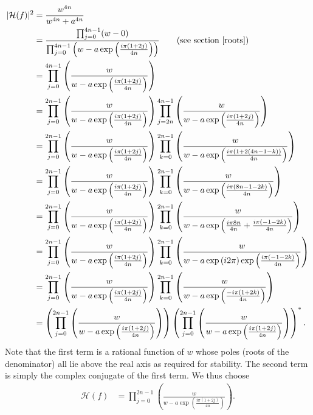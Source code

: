 \documentclass[a4paper]{article}
\begin{document}
\begin{align}
    |\mathcal{H}(f)|^2 &= \frac{w^{4n}}{w^{4n} + a^{4n}} \label{eq:high_pass_factor1}\\
                       &=  \frac{\prod_{j=0}^{4 n - 1}(w - 0)}{\prod_{j=0}^{4 n - 1}\left(w - a\exp\left(\frac{i \pi (1 + 2 j)}{4 n}\right)\right)} \qquad\textrm{(see section \ref{roots})} \label{eq:high_pass_factor2}\\
                       &= \prod_{j=0}^{4 n - 1} \left(\frac{w}{w - a\exp\left(\frac{i \pi (1 + 2 j)}{4 n}\right)}\right) \\
                       &= \prod_{j=0}^{2 n - 1} \left(\frac{w}{w - a\exp\left(\frac{i \pi (1 + 2 j)}{4 n}\right)}\right)
                          \prod_{j=2n}^{4 n - 1} \left(\frac{w}{w - a\exp\left(\frac{i \pi (1 + 2 j)}{4 n}\right)}\right) \\
                       &= \prod_{j=0}^{2 n - 1} \left(\frac{w}{w - a\exp\left(\frac{i \pi (1 + 2 j)}{4 n}\right)}\right)
                          \prod_{k=0}^{2 n - 1} \left(\frac{w}{w - a\exp\left(\frac{i \pi (1 + 2 (4 n - 1 - k))}{4 n}\right)}\right) \\
                       &= \prod_{j=0}^{2 n - 1} \left(\frac{w}{w - a\exp\left(\frac{i \pi (1 + 2 j)}{4 n}\right)}\right)
                          \prod_{k=0}^{2 n - 1} \left(\frac{w}{w - a\exp\left(\frac{i \pi (8n - 1 - 2 k)}{4 n}\right)}\right) \\
                       &= \prod_{j=0}^{2 n - 1} \left(\frac{w}{w - a\exp\left(\frac{i \pi (1 + 2 j)}{4 n}\right)}\right)
                          \prod_{k=0}^{2 n - 1} \left(\frac{w}{w - a\exp\left(\frac{i \pi 8 n}{4 n} + \frac{i \pi (- 1 - 2 k)}{4 n}\right)}\right) \\
                       &= \prod_{j=0}^{2 n - 1} \left(\frac{w}{w - a\exp\left(\frac{i \pi (1 + 2 j)}{4 n}\right)}\right)
                          \prod_{k=0}^{2 n - 1} \left(\frac{w}{w - a\exp\left(i 2 \pi\right) \exp\left(\frac{i \pi (- 1 - 2 k)}{4 n}\right)}\right) \\
                       &= \prod_{j=0}^{2 n - 1} \left(\frac{w}{w - a\exp\left(\frac{i \pi (1 + 2 j)}{4 n}\right)}\right)
                          \prod_{k=0}^{2 n - 1} \left(\frac{w}{w - a\exp\left(\frac{-i \pi (1 + 2 k)}{4 n}\right)}\right) \\
                       &= \left(\prod_{j=0}^{2 n - 1} \left(\frac{w}{w - a\exp\left(\frac{i \pi (1 + 2 j)}{4 n}\right)}\right)\right)
                          \left(\prod_{j=0}^{2 n - 1} \left(\frac{w}{w - a\exp\left(\frac{i \pi (1 + 2 j)}{4 n}\right)}\right)\right)^{*}\label{eq:highpass_factor_n}.
\end{align}
Note that the first term is a rational function of $w$ whose poles (roots of
the denominator) all lie above the real axis as required for stability.  The
second term is simply the complex conjugate of the first term.  We thus choose
\begin{align}
    \mathcal{H}(f) &= \prod_{j=0}^{2 n - 1} \left(\frac{w}{w - a\exp\left(\frac{i \pi (1 + 2 j)}{4 n}\right)}\right).
\end{align}
\end{document}
